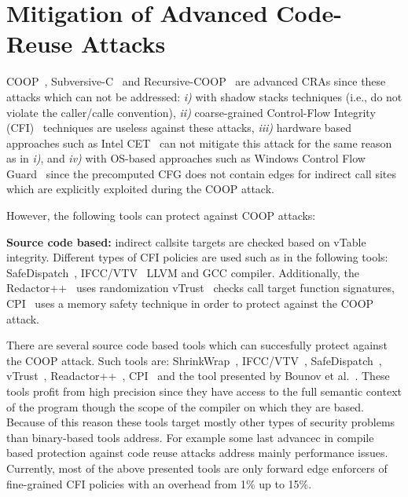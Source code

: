 \section{Mitigation of Advanced Code-Reuse Attacks}
\label{Mitigation of Advanced Code-Reuse Attacks}

COOP~\cite{schuster:coop}, Subversive-C~\cite{subversive-c:lettner} and Recursive-COOP~\cite{crane:readactor++}
are advanced CRAs since these attacks which can not be addressed:
\textit{i)}  with shadow stacks techniques (i.e., do not violate the caller/calle convention), 
\textit{ii)} coarse-grained Control-Flow Integrity (CFI)~\cite{abadi:cfi2, abadi:cfi} techniques are useless against these attacks, 
\textit{iii)} hardware based approaches such as Intel CET~\cite{intel:cet} can not mitigate this attack for the same reason as in \textit{i)}, and 
\textit{iv)} with OS-based approaches such as Windows Control Flow Guard~\cite{windows:cfguard} 
since the precomputed CFG does not contain edges for indirect call sites which are explicitly exploited during the COOP attack.

However, the following tools can protect against COOP attacks:

\textbf{Source code based:} indirect callsite targets are checked based on vTable integrity.
Different types of CFI policies are used such as in the following tools:
SafeDispatch~\cite{safedispatch:jang}, IFCC/VTV~\cite{vtv:tice} LLVM and GCC compiler.
Additionally, the Redactor++~\cite{crane:readactor++} uses randomization 
vTrust~\cite{zhang:vtrust} checks call target function signatures, 
CPI~\cite{volodymyr:cpi} uses a memory safety technique
in order to protect against the COOP attack.

There are several source code based tools 
which can succesfully protect against the COOP attack.
Such tools are: ShrinkWrap~\cite{haller:shrinkwrap}, IFCC/VTV~\cite{vtv:tice}, 
SafeDispatch~\cite{safedispatch:jang}, vTrust~\cite{zhang:vtrust}, Readactor++~\cite{crane:readactor++}, CPI~\cite{volodymyr:cpi} and the
tool presented by Bounov et al.~\cite{bounov:interleaving}. These tools profit from high precision
since they have access to the full semantic context of the program though the scope
of the compiler on which they are based. 
Because of this reason these tools target mostly other types of security problems than binary-based 
tools address. For example some last advancec in compile based protection against 
code reuse attacks address mainly performance issues.
Currently, most of the above presented tools are only forward
edge enforcers of fine-grained CFI policies with an overhead from 1\% up to 15\%.

